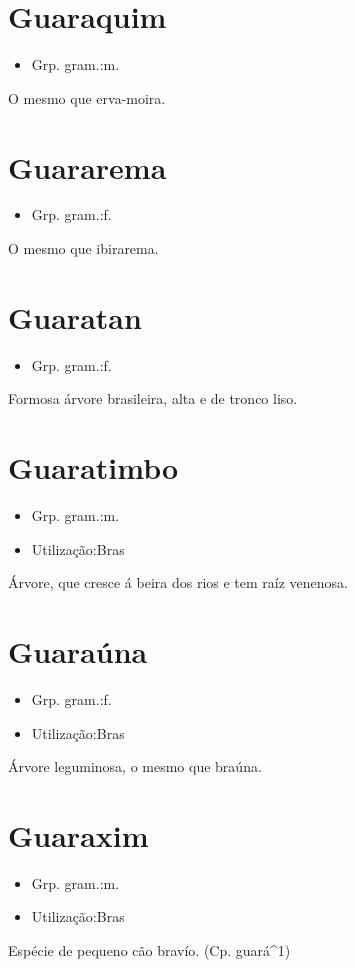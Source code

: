 \section{Guaraquim}
\begin{itemize}
\item {Grp. gram.:m.}
\end{itemize}
O mesmo que \textunderscore erva-moira\textunderscore .
\section{Guararema}
\begin{itemize}
\item {Grp. gram.:f.}
\end{itemize}
O mesmo que \textunderscore ibirarema\textunderscore .
\section{Guaratan}
\begin{itemize}
\item {Grp. gram.:f.}
\end{itemize}
Formosa árvore brasileira, alta e de tronco liso.
\section{Guaratimbo}
\begin{itemize}
\item {Grp. gram.:m.}
\end{itemize}
\begin{itemize}
\item {Utilização:Bras}
\end{itemize}
Árvore, que cresce á beira dos rios e tem raíz venenosa.
\section{Guaraúna}
\begin{itemize}
\item {Grp. gram.:f.}
\end{itemize}
\begin{itemize}
\item {Utilização:Bras}
\end{itemize}
Árvore leguminosa, o mesmo que \textunderscore braúna\textunderscore .
\section{Guaraxim}
\begin{itemize}
\item {Grp. gram.:m.}
\end{itemize}
\begin{itemize}
\item {Utilização:Bras}
\end{itemize}
Espécie de pequeno cão bravío.
(Cp. \textunderscore guará\textunderscore ^1)
